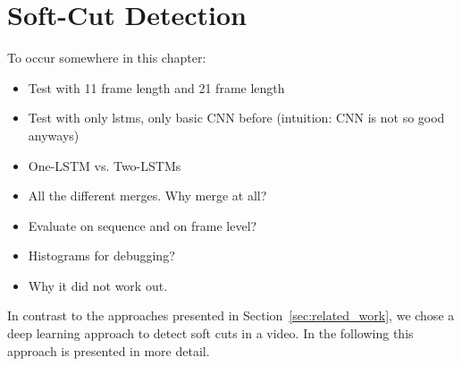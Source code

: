 \section{Soft-Cut Detection}
\label{sec:soft_cut}

To occur somewhere in this chapter:
\begin{itemize}
    \item Test with 11 frame length and 21 frame length
    \item Test with only lstms, only basic CNN before (intuition: CNN is not so good anyways)
    \item One-LSTM vs. Two-LSTMs
    \item All the different merges. Why merge at all?
    \item Evaluate on sequence and on frame level?
    \item Histograms for debugging?
    \item Why it did not work out.
    
\end{itemize}

%
%


In contrast to the approaches presented in Section~\ref{sec:related_work}, we chose a deep learning approach to detect soft cuts in a video.
In the following this approach is presented in more detail.




